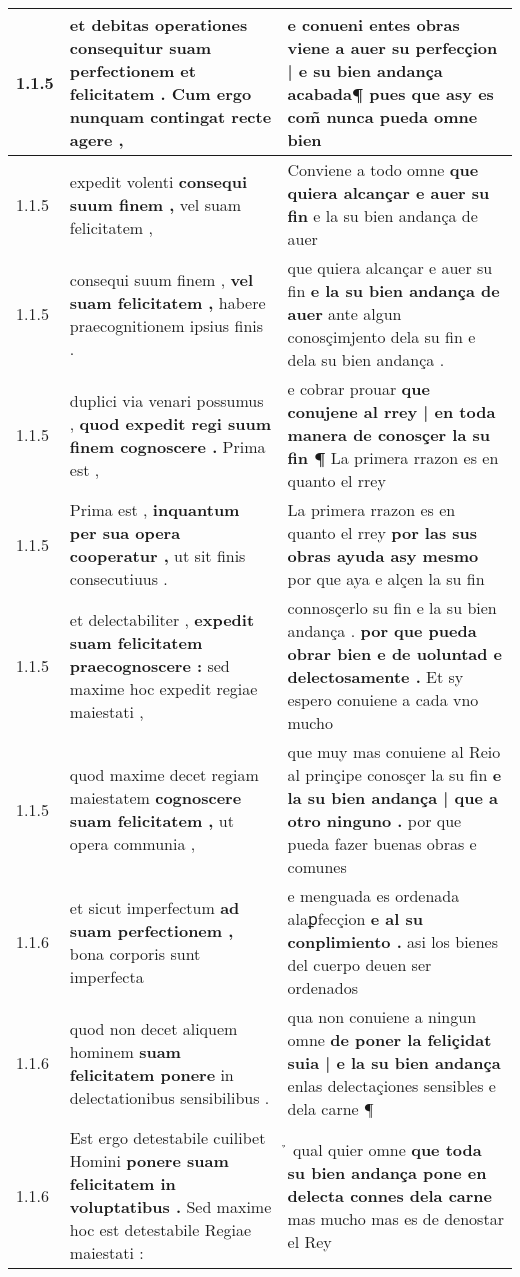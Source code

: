 \begin{tabular}{|p{1cm}|p{6.5cm}|p{6.5cm}|}
1.1.5 & et debitas operationes \textbf{ consequitur suam perfectionem et felicitatem . } Cum ergo nunquam contingat recte agere , & e conueni entes obras \textbf{ viene a auer su perfecçion | e su bien andança acabada¶ } pues que asy es com̃ nunca pueda omne bien \\\hline
1.1.5 & expedit volenti \textbf{ consequi suum finem , } vel suam felicitatem , & Conviene a todo omne \textbf{ que quiera alcançar e auer su fin } e la su bien andança de auer \\\hline
1.1.5 & consequi suum finem , \textbf{ vel suam felicitatem , } habere praecognitionem ipsius finis . & que quiera alcançar e auer su fin \textbf{ e la su bien andança de auer } ante algun conosçimjento dela su fin e dela su bien andança . \\\hline
1.1.5 & duplici via venari possumus , \textbf{ quod expedit regi suum finem cognoscere . } Prima est , & e cobrar prouar \textbf{ que conujene al rrey | en toda manera de conosçer la su fin ¶ } La primera rrazon es en quanto el rrey \\\hline
1.1.5 & Prima est , \textbf{ inquantum per sua opera cooperatur , } ut sit finis consecutiuus . & La primera rrazon es en quanto el rrey \textbf{ por las sus obras ayuda asy mesmo } por que aya e alçen la su fin \\\hline
1.1.5 & et delectabiliter , \textbf{ expedit suam felicitatem praecognoscere : } sed maxime hoc expedit regiae maiestati , & connosçerlo su fin e la su bien andança . \textbf{ por que pueda obrar bien e de uoluntad e delectosamente . } Et sy espero conuiene a cada vno mucho \\\hline
1.1.5 & quod maxime decet regiam maiestatem \textbf{ cognoscere suam felicitatem , } ut opera communia , & que muy mas conuiene al Reio al prinçipe conosçer la su fin \textbf{ e la su bien andança | que a otro ninguno . } por que pueda fazer buenas obras e comunes \\\hline
1.1.6 & et sicut imperfectum \textbf{ ad suam perfectionem , } bona corporis sunt imperfecta & e menguada es ordenada alaꝑfecçion \textbf{ e al su conplimiento . } asi los bienes del cuerpo deuen ser ordenados \\\hline
1.1.6 & quod non decet aliquem hominem \textbf{ suam felicitatem ponere } in delectationibus sensibilibus . & qua non conuiene a ningun omne \textbf{ de poner la feliçidat suia | e la su bien andança } enlas delectaçiones sensibles e dela carne ¶ \\\hline
1.1.6 & Est ergo detestabile cuilibet Homini \textbf{ ponere suam felicitatem in voluptatibus . } Sed maxime hoc est detestabile Regiae maiestati : & ̉ qual quier omne \textbf{ que toda su bien andança pone en delecta connes dela carne } mas mucho mas es de denostar el Rey \\\hline

\end{tabular}
